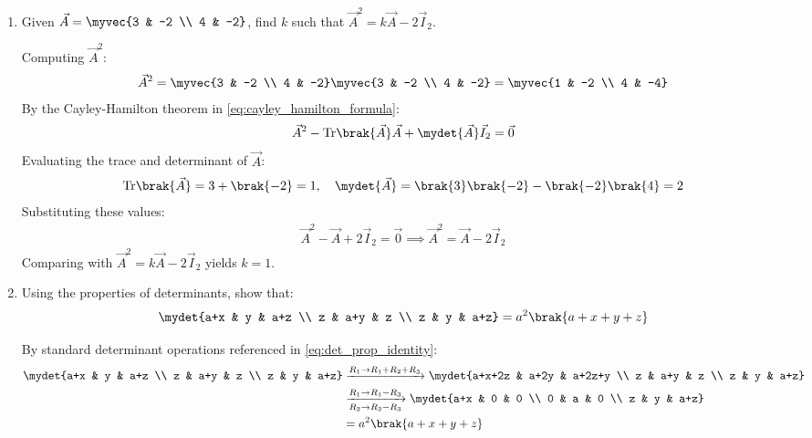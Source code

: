 \begin{enumerate}[label=\thesubsection.\arabic*, ref=\thesubsection.\theenumi]
	\item Given $\vec{A} = \myvec{3 & -2 \\ 4 & -2}$, find $k$ such that $\vec{A}^2 = k\vec{A} - 2\vec{I}_2$. \hfill {}
	
	\solution
	Computing $\vec{A}^2$:
	\begin{align}
		\vec{A}^2 = \myvec{3 & -2 \\ 4 & -2}\myvec{3 & -2 \\ 4 & -2} = \myvec{1 & -2 \\ 4 & -4}
	\end{align}
	By the Cayley-Hamilton theorem in \eqref{eq:cayley_hamilton_formula}:
	\begin{align}
		\vec{A}^2 - \text{Tr}\brak{\vec{A}}\vec{A} + \mydet{\vec{A}}\vec{I}_2 = \vec{0}
	\end{align}
	Evaluating the trace and determinant of $\vec{A}$:
	\begin{align}
		\text{Tr}\brak{\vec{A}} = 3 + \brak{-2} = 1, \quad \mydet{\vec{A}} = \brak{3}\brak{-2} - \brak{-2}\brak{4} = 2
	\end{align}
	Substituting these values:
	\begin{align}
		\vec{A}^2 - \vec{A} + 2\vec{I}_2 = \vec{0} \implies \vec{A}^2 = \vec{A} - 2\vec{I}_2
	\end{align}
	Comparing with $\vec{A}^2 = k\vec{A} - 2\vec{I}_2$ yields $k = 1$.
	
	\item Using the properties of determinants, show that:
	\begin{align*}
		\mydet{a+x & y & a+z \\ z & a+y & z \\ z & y & a+z} = a^2\brak{a+x+y+z}
	\end{align*}
	\hfill {}
	
	\solution
	By standard determinant operations referenced in \eqref{eq:det_prop_identity}:
	\begin{align}
		\mydet{a+x & y & a+z \\ z & a+y & z \\ z & y & a+z} 
		&\xrightarrow{R_1 \to R_1 + R_2 + R_3} \mydet{a+x+2z & a+2y & a+2z+y \\ z & a+y & z \\ z & y & a+z} \\
		&\xrightarrow[R_2 \to R_2 - R_3]{R_1 \to R_1 - R_3} \mydet{a+x & 0 & 0 \\ 0 & a & 0 \\ z & y & a+z} \\
		&= a^2\brak{a+x+y+z}
	\end{align}
	

\end{enumerate}

